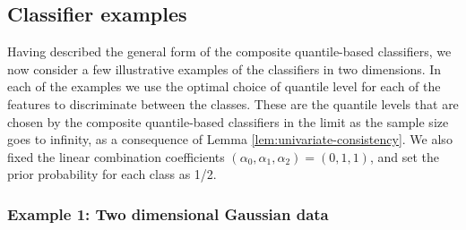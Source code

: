 

\subsection{Classifier examples}
\label{sec:classifier-examples}

Having described the general form of the composite quantile-based classifiers,
we now consider a few illustrative examples of the classifiers in two
dimensions.  In each of the examples we use the optimal choice of quantile level
for each of the features to discriminate between the classes.  These are the
quantile levels that are chosen by the composite quantile-based classifiers in
the limit as the sample size goes to infinity, as a consequence of Lemma
\ref{lem:univariate-consistency}.  We also fixed the linear combination
coefficients $(\alpha_0, \alpha_1, \alpha_2) = (0, 1, 1)$, and set the prior
probability for each class as 1/2.


\subsubsection*{Example 1:  Two dimensional Gaussian data}
\label{sec:classifier-examples-gaussian}

